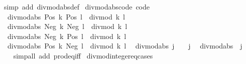 \begin{isabellebody}
\isamarkupfalse%
\ {\isacharparenleft}{\kern0pt}simp\ add{\isacharcolon}{\kern0pt}\ divmod{\isacharunderscore}{\kern0pt}abs{\isacharunderscore}{\kern0pt}def{\isacharparenright}{\kern0pt}%
\endisatagproof
{\isafoldproof}%
%
\isadelimproof
\isanewline
%
\endisadelimproof
\isanewline
{}\isamarkupfalse%
\ divmod{\isacharunderscore}{\kern0pt}abs{\isacharunderscore}{\kern0pt}code\ {\isacharbrackleft}{\kern0pt}code{\isacharbrackright}{\kern0pt}{\isacharcolon}{\kern0pt}\isanewline
\ \ {\isachardoublequoteopen}divmod{\isacharunderscore}{\kern0pt}abs\ {\isacharparenleft}{\kern0pt}Pos\ k{\isacharparenright}{\kern0pt}\ {\isacharparenleft}{\kern0pt}Pos\ l{\isacharparenright}{\kern0pt}\ {\isacharequal}{\kern0pt}\ divmod\ k\ l{\isachardoublequoteclose}\isanewline
\ \ {\isachardoublequoteopen}divmod{\isacharunderscore}{\kern0pt}abs\ {\isacharparenleft}{\kern0pt}Neg\ k{\isacharparenright}{\kern0pt}\ {\isacharparenleft}{\kern0pt}Neg\ l{\isacharparenright}{\kern0pt}\ {\isacharequal}{\kern0pt}\ divmod\ k\ l{\isachardoublequoteclose}\isanewline
\ \ {\isachardoublequoteopen}divmod{\isacharunderscore}{\kern0pt}abs\ {\isacharparenleft}{\kern0pt}Neg\ k{\isacharparenright}{\kern0pt}\ {\isacharparenleft}{\kern0pt}Pos\ l{\isacharparenright}{\kern0pt}\ {\isacharequal}{\kern0pt}\ divmod\ k\ l{\isachardoublequoteclose}\isanewline
\ \ {\isachardoublequoteopen}divmod{\isacharunderscore}{\kern0pt}abs\ {\isacharparenleft}{\kern0pt}Pos\ k{\isacharparenright}{\kern0pt}\ {\isacharparenleft}{\kern0pt}Neg\ l{\isacharparenright}{\kern0pt}\ {\isacharequal}{\kern0pt}\ divmod\ k\ l{\isachardoublequoteclose}\isanewline
\ \ {\isachardoublequoteopen}divmod{\isacharunderscore}{\kern0pt}abs\ j\ {}\ {\isacharequal}{\kern0pt}\ {\isacharparenleft}{\kern0pt}{}{\isacharcomma}{\kern0pt}\ {\isasymbar}j{\isasymbar}{\isacharparenright}{\kern0pt}{\isachardoublequoteclose}\isanewline
\ \ {\isachardoublequoteopen}divmod{\isacharunderscore}{\kern0pt}abs\ {}\ j\ {\isacharequal}{\kern0pt}\ {\isacharparenleft}{\kern0pt}{}{\isacharcomma}{\kern0pt}\ {}{\isacharparenright}{\kern0pt}{\isachardoublequoteclose}\isanewline
%
\isadelimproof
\ \ %
\endisadelimproof
%
\isatagproof
{}\isamarkupfalse%
\ {\isacharparenleft}{\kern0pt}simp{\isacharunderscore}{\kern0pt}all\ add{\isacharcolon}{\kern0pt}\ prod{\isacharunderscore}{\kern0pt}eq{\isacharunderscore}{\kern0pt}iff{\isacharparenright}{\kern0pt}%
\endisatagproof
{\isafoldproof}%
%
\isadelimproof
\isanewline
%
\endisadelimproof
\isanewline
{}\isamarkupfalse%
\ divmod{\isacharunderscore}{\kern0pt}integer{\isacharunderscore}{\kern0pt}eq{\isacharunderscore}{\kern0pt}cases{\isacharcolon}{\kern0pt}\isanewline

\end{isabellebody}

